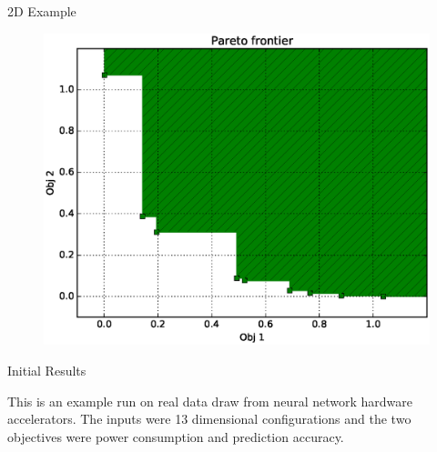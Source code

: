 \documentclass[final]{beamer}
\newlength{\twocolwid}
\begin{document}
\begin{frame}[t]
\begin{columns}[t]
\begin{column}{\twocolwid}
\begin{alertblock}{2D Example}
\begin{figure}
\begin{minipage}{.33\textwidth}
  \includegraphics[width=\linewidth]{optimizer/pareto.eps}
\end{minipage}
\end{figure}

\end{alertblock} 


\begin{block}{Initial Results}

This is an example run on real data draw from neural network hardware accelerators. The inputs were 13 dimensional configurations and the two objectives were power consumption and prediction accuracy.


\end{block}
\end{column}
\end{columns}
\end{frame}
\end{document}
